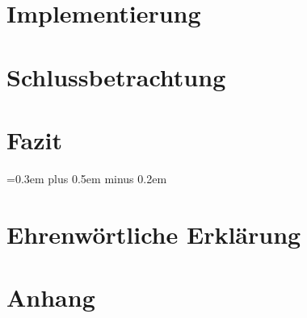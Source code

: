 \documentclass[
	12pt, %
	a4paper,
	bibliography=totoc, %
	numbers=noenddot, %
	ngerman, %
	headsepline, %
	oneside %
	]{scrbook} %
\begin{document}
\chapter{Implementierung}\label{ch:implementierung}


\chapter{Schlussbetrachtung}\label{ch:bewertung}


\chapter{Fazit}\label{ch:fazit}


\spaceskip=0.3em plus 0.5em minus 0.2em
\printbibliography


\chapter*{Ehrenwörtliche Erklärung}
\pagestyle{empty}


\appendix
\chapter*{Anhang}
\pagestyle{empty}

\end{document}
